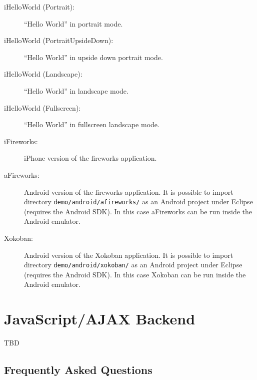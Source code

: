 \documentclass[11pt]{book}
\begin{document}
\begin{description}

\item[iHelloWorld (Portrait):] ``Hello World'' in portrait mode.
\item[iHelloWorld (PortraitUpsideDown):] ``Hello World'' in upside
  down portrait mode.
\item[iHelloWorld (Landscape):] ``Hello World'' in landscape mode.
\item[iHelloWorld (Fullscreen):] ``Hello World'' in fullscreen
  landscape mode.
\item[iFireworks:] iPhone version of the fireworks application.
\item[aFireworks:] Android version of the fireworks application. It is
  possible to import directory \texttt{demo/android/afireworks/} as an
  Android project under Eclipse (requires the Android SDK). In this
  case aFireworks can be run inside the Android emulator.
\item[Xokoban:] Android version of the Xokoban application. It is
  possible to import directory \texttt{demo/android/xokoban/} as an
  Android project under Eclipse (requires the Android SDK). In this
  case Xokoban can be run inside the Android emulator.
\end{description}


\chapter{JavaScript/AJAX Backend}

TBD


\begin{appendix}
\chapter{Frequently Asked Questions}

\end{appendix}

\raggedright


\end{document}
